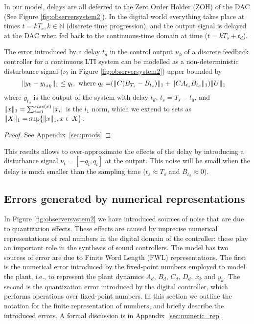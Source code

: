 \documentclass[sigconf]{llncs}
\DeclarePairedDelimiter\norm{\lVert}{\rVert}
\newcommand{\mat}[1]{{#1}}
\renewcommand{\vec}[1]{{#1}}
\begin{document}
In our model, delays are all deferred to the Zero Order Holder (ZOH) of the DAC (See Figure \ref{fig:observersystem2}). 
In the digital world everything takes place at times $t=kT_s, k \in \mathbb{N}$ (discrete time progression),
and the output signal is delayed at the DAC when fed back to the continuous-time domain at time ($t=kT_s+t_d$).

\begin{theorem}
The error introduced by a delay $t_d$ in the control output $\vec{u}_k$ of a discrete feedback controller for a continuous LTI system can be modelled as a non-deterministic disturbance signal ($\nu_t$ in Figure \ref{fig:observersystem2}) upper bounded by 
\begin{align}
\norm{\vec{y}_{k}-{\vec{y}_{t_d}}_{k}}_1 \leq q_t, \text{ where } q_t=&(\norm{\mat{C}(\mat{B}_{T_s}-\mat{B}_{t_s})}_1+\norm{\mat{C}\mat{A}_{t_s}\mat{B}_{t_d}}_1)\norm{U}_1
\end{align}
where $\vec{y}_{t_d}$ is the output of the system with delay $t_d$, $t_s=T_s-t_d$,
and $\norm{\vec{x}}_1=\sum_{i=0}^{size(\vec{x})} |\vec{x}_i|$ is the $l_1$ norm, 
which we extend to sets as $\norm{X}_1 = \sup \{\norm{\vec{x}}_1, \vec{x} \in X\}$.  
\end{theorem}
%
\begin{proof}
See Appendix~\ref{sec:proofs}
\end{proof}
This results allows to over-approximate the effects of the delay by introducing a disturbance signal $\nu_t=[-q_t, q_t]$ at the output.
 This noise will be small when the delay is much smaller than the sampling time ($t_s\approx T_s$ and $\mat{B}_{t_d} \approx 0$).

\subsection{Errors generated by numerical representations} 
\label{sec:numeric_rep2}

In Figure \ref{fig:observersystem2} we have introduced sources of noise that are due to quantization effects.  
These effects are caused by imprecise numerical representations of real numbers in the digital domain of the controller: 
these play an important role in the synthesis of sound controllers. 
The model has two sources of error are due to Finite Word Length (FWL) representations. 
The first is the numerical error introduced by the fixed-point numbers employed to model the plant, 
i.e., to represent the plant dynamics $A_d$, $B_d$, $C_d$, $D_d$, $x_k$ and $y_k$. 
The second is the quantization error introduced by the digital controller, 
which performs operations over fixed-point numbers.  
In this section we outline the notation for the finite representation of numbers, 
and briefly describe the introduced errors.  
A formal discussion is in Appendix~\ref{sec:numeric_rep}.
\end{document}
